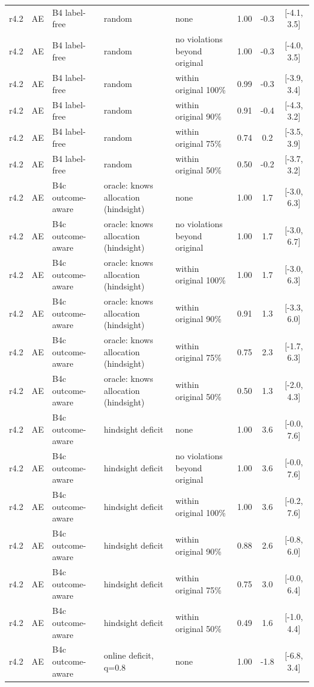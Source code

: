 \begin{longtable}{lllp{4.2cm}p{3.4cm}ccc}
r4.2 & AE & B4 label-free & random & none & 1.00 & -0.3 & [-4.1, 3.5] \\
r4.2 & AE & B4 label-free & random & no violations beyond original & 1.00 & -0.3 & [-4.0, 3.5] \\
r4.2 & AE & B4 label-free & random & within original 100\% & 0.99 & -0.3 & [-3.9, 3.4] \\
r4.2 & AE & B4 label-free & random & within original 90\% & 0.91 & -0.4 & [-4.3, 3.2] \\
r4.2 & AE & B4 label-free & random & within original 75\% & 0.74 & 0.2 & [-3.5, 3.9] \\
r4.2 & AE & B4 label-free & random & within original 50\% & 0.50 & -0.2 & [-3.7, 3.2] \\
r4.2 & AE & B4c outcome-aware & oracle: knows allocation (hindsight) & none & 1.00 & 1.7 & [-3.0, 6.3] \\
r4.2 & AE & B4c outcome-aware & oracle: knows allocation (hindsight) & no violations beyond original & 1.00 & 1.7 & [-3.0, 6.7] \\
r4.2 & AE & B4c outcome-aware & oracle: knows allocation (hindsight) & within original 100\% & 1.00 & 1.7 & [-3.0, 6.3] \\
r4.2 & AE & B4c outcome-aware & oracle: knows allocation (hindsight) & within original 90\% & 0.91 & 1.3 & [-3.3, 6.0] \\
r4.2 & AE & B4c outcome-aware & oracle: knows allocation (hindsight) & within original 75\% & 0.75 & 2.3 & [-1.7, 6.3] \\
r4.2 & AE & B4c outcome-aware & oracle: knows allocation (hindsight) & within original 50\% & 0.50 & 1.3 & [-2.0, 4.3] \\
r4.2 & AE & B4c outcome-aware & hindsight deficit & none & 1.00 & 3.6 & [-0.0, 7.6] \\
r4.2 & AE & B4c outcome-aware & hindsight deficit & no violations beyond original & 1.00 & 3.6 & [-0.0, 7.6] \\
r4.2 & AE & B4c outcome-aware & hindsight deficit & within original 100\% & 1.00 & 3.6 & [-0.2, 7.6] \\
r4.2 & AE & B4c outcome-aware & hindsight deficit & within original 90\% & 0.88 & 2.6 & [-0.8, 6.0] \\
r4.2 & AE & B4c outcome-aware & hindsight deficit & within original 75\% & 0.75 & 3.0 & [-0.0, 6.4] \\
r4.2 & AE & B4c outcome-aware & hindsight deficit & within original 50\% & 0.49 & 1.6 & [-1.0, 4.4] \\
r4.2 & AE & B4c outcome-aware & online deficit, q=0.8 & none & 1.00 & -1.8 & [-6.8, 3.4] \\

\end{longtable}
